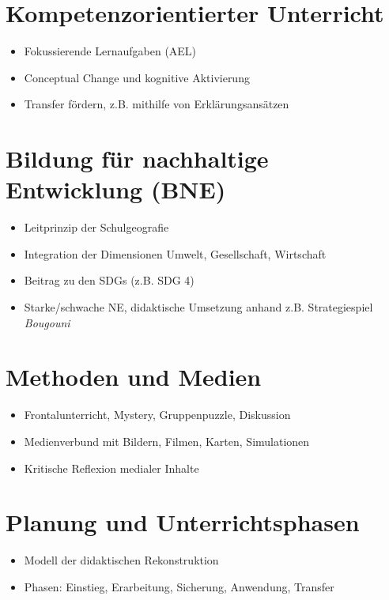 \section{Kompetenzorientierter Unterricht}
\begin{itemize}[leftmargin=*]
  \item Fokussierende Lernaufgaben (AEL)
  \item Conceptual Change und kognitive Aktivierung
  \item Transfer fördern, z.B. mithilfe von Erklärungsansätzen
\end{itemize}

\section{Bildung für nachhaltige Entwicklung (BNE)}
\begin{itemize}[leftmargin=*]
  \item Leitprinzip der Schulgeografie
  \item Integration der Dimensionen Umwelt, Gesellschaft, Wirtschaft
  \item Beitrag zu den SDGs (z.B. SDG 4)
  \item Starke/schwache NE, didaktische Umsetzung anhand z.B. Strategiespiel \emph{Bougouni}
\end{itemize}

\section{Methoden und Medien}
\begin{itemize}[leftmargin=*]
  \item Frontalunterricht, Mystery, Gruppenpuzzle, Diskussion
  \item Medienverbund mit Bildern, Filmen, Karten, Simulationen
  \item Kritische Reflexion medialer Inhalte
\end{itemize}

\section{Planung und Unterrichtsphasen}
\begin{itemize}[leftmargin=*]
  \item Modell der didaktischen Rekonstruktion
  \item Phasen: Einstieg, Erarbeitung, Sicherung, Anwendung, Transfer
\end{itemize}